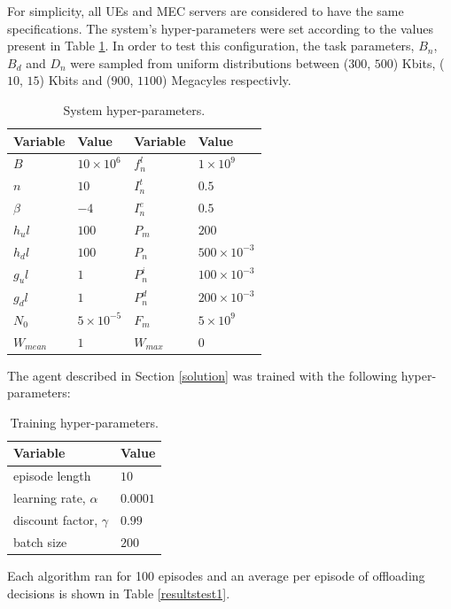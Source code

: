 \documentclass[conference]{IEEEtran}
\begin{document}
For simplicity, all \acrshort{UE}s and \acrshort{MEC} servers are considered to have the same specifications. The system's hyper-parameters were set according to the values present in Table \ref{hyperparams}. In order to test this configuration, the task parameters, $B_n$, $B_d$ and $D_n$ were sampled from uniform distributions between ($300$, $500$) Kbits, ($10$, $15$) Kbits and ($900$, $1100$) Megacyles respectivly. 

\begin{table}[H]
\centering
\begin{tabular}{|l|l|l|l|}
\hline
Variable             & Value & Variable                & Value \\ \hline
$B$&$10\times10^{6}$&$f_n^l$&$1\times10^{9}$\\
$n$&$10$&$I_n^t$&$0.5$\\
$\beta$&$-4$&$I_n^e$&$0.5$\\
$h_ul$&$100$& $P_m$&$200$\\
$h_dl$&$100$& $P_n$& $500\times10^{-3}$\\
$g_ul$&$1$&$P_n^i$&$100\times10^{-3}$\\
$g_dl$&$1$&$P_n^d$&$200\times10^{-3}$\\
$N_0$&$5\times10^{-5}$&$F_m$&$5\times10^{9}$\\
$W_{mean}$&$1$&$W_{max}$&$0$\\ \hline
\end{tabular}
\caption{System hyper-parameters.}\label{hyperparams}
\end{table}

The agent described in Section \ref{solution} was trained with the following hyper-parameters:

\begin{table}[H]
\centering
\begin{tabular}{|l|l|}
\hline
Variable & Value \\ \hline
episode length&$10$\\
learning rate, $\alpha$&$0.0001$\\
discount factor, $\gamma$&$0.99$\\
batch size&$200$\\ \hline
\end{tabular}
\caption{Training hyper-parameters.}\label{training_hyperparams}
\end{table}

Each algorithm ran for 100 episodes and an average per episode of offloading decisions is shown in Table \ref{resultstest1}.
\end{document}
